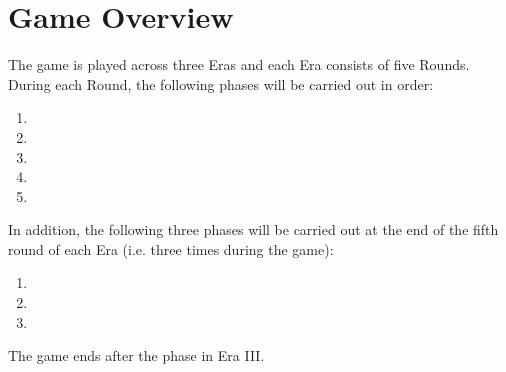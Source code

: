 \documentclass[10pt,twocolumn]{article}
\begin{document}
\section{Game Overview}
The game is played across three Eras and each Era consists of five Rounds. During each Round, the following phases will be carried out in order:
\begin{enumerate}
\item {}
\item {}
\item {}
\item {}
\item {}
\end{enumerate}
In addition, the following three phases will be carried out at the end of the fifth round of each Era (i.e. three times during the game):
\begin{enumerate}[resume]
\item {}
\item {}
\item {}
\end{enumerate}

The game ends after the  phase in Era III.
\end{document}
